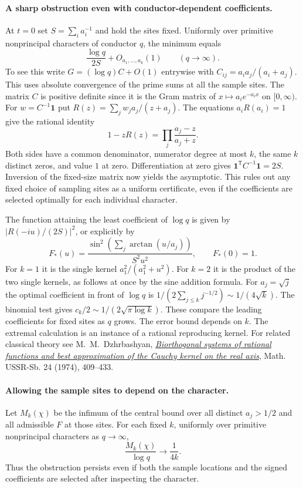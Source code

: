 \paragraph{A sharp obstruction even with conductor-dependent coefficients.}
At $t=0$ set $S=\sum_i a_i^{-1}$ and hold the sites fixed. Uniformly over
primitive nonprincipal characters of conductor $q$, the minimum equals
\[
       \frac{\log q}{2S}+O_{a_1,\ldots,a_k}(1) \qquad(q\longrightarrow\infty).
\]
To see this write $G=(\log q)C+O(1)$ entrywise with
$C_{ij}=a_i a_j/(a_i+a_j)$. This uses absolute convergence of the
prime sums at all the sample sites. The matrix $C$ is positive definite since it is the Gram matrix of $x\mapsto a_i e^{-a_i x}$ on $[0,\infty)$.
For $w=C^{-1}\mathbf1$ put $R(z)=\sum_jw_j a_j/(z+a_j)$.
The equations $a_iR(a_i)=1$ give the rational identity
\[
 1-zR(z)=\prod_j\frac{a_j-z}{a_j+z}.
\]
Both sides have a common denominator, numerator degree at most $k$, the
same $k$ distinct zeros, and value $1$ at zero. Differentiation at zero
gives $\mathbf1^{\mathsf T}C^{-1}\mathbf1=2S$. Inversion of the
fixed-size matrix now yields the asymptotic. This rules out any
fixed choice of sampling sites as a uniform certificate, even if the
coefficients are selected optimally for each individual character.

The function attaining the least coefficient of $\log q$ is given by
$|R(-iu)/(2S)|^2$, or explicitly by
\[
 F_*(u)=\frac{\sin^2(\sum_j\arctan(u/a_j))}{S^2u^2},
 \qquad F_*(0)=1.
\]
For $k=1$ it is the single kernel $a_1^2/(a_1^2+u^2)$. For $k=2$ it is
the product of the two single kernels, as follows at once by the
sine addition formula. For $a_j=\sqrt j$ the optimal coefficient in
front of $\log q$ is $1/(2\sum_{j\le k}j^{-1/2})\sim 1/(4\sqrt{k})$.
The binomial test gives $c_k/2\sim1/(2\sqrt{\pi\log k})$.
These compare the leading coefficients for fixed sites as $q$ grows. The error bound depends on $k$.
The extremal calculation is an instance of a rational reproducing
kernel. For related classical theory see M.~M.~Dzhrbashyan,
\href{https://www.mathnet.ru/eng/sm3761}{\emph{Biorthogonal systems of
rational functions and best approximation of the Cauchy kernel on the
real axis}}, Math. USSR-Sb. 24 (1974), 409--433.

\paragraph{Allowing the sample sites to depend on the character.}
Let $M_k(\chi)$ be the infimum of the central bound over all distinct
$a_j>1/2$ and all admissible $F$ at those sites. For each fixed $k$,
uniformly over primitive nonprincipal characters as $q\to\infty$,
\[
                    \frac{M_k(\chi)}{\log q}\longrightarrow\frac{1}{4k}.
\]
Thus the obstruction persists even if both the sample locations and
the signed coefficients are selected after inspecting the character.

